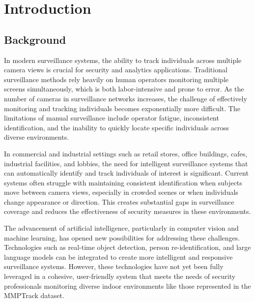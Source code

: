 \newcommand{\persona}[4]{%
    \textbf{#1}
    \small\begin{tabular}[t]{|p{.8in} | p{1.5in}|}
        \hline
        \textbf{Preferences} & #2 \\\hline
        \textbf{Pain Points} & #3 \\\hline
        \textbf{Goals} & #4 \\
        \hline
    \end{tabular}
    \vspace{4pt}
}


\chapter{Introduction}
\label{chap:introduction}

\section{Background}
\label{section:background}

In modern surveillance systems, the ability to track individuals across multiple camera views is crucial for security and analytics applications.
Traditional surveillance methods rely heavily on human operators monitoring multiple screens simultaneously, which is both labor-intensive and prone to error.
As the number of cameras in surveillance networks increases, the challenge of effectively monitoring and tracking individuals becomes exponentially more difficult.
The limitations of manual surveillance include operator fatigue, inconsistent identification, and the inability to quickly locate specific individuals across diverse environments. \cite{surveillanceetal:2023}

In commercial and industrial settings such as retail stores, office buildings, cafes, industrial facilities, and lobbies,
the need for intelligent surveillance systems that can automatically identify and track individuals of interest is significant.
Current systems often struggle with maintaining consistent identification when subjects move between camera views,
especially in crowded scenes or when individuals change appearance or direction. This creates substantial gaps in surveillance coverage
and reduces the effectiveness of security measures in these environments.

The advancement of artificial intelligence, particularly in computer vision and machine learning,
has opened new possibilities for addressing these challenges. Technologies such as real-time object detection,
person re-identification, and large language models can be integrated to create more intelligent and responsive surveillance systems.
However, these technologies have not yet been fully leveraged in a cohesive, user-friendly system that meets the needs of security professionals
monitoring diverse indoor environments like those represented in the MMPTrack dataset.


